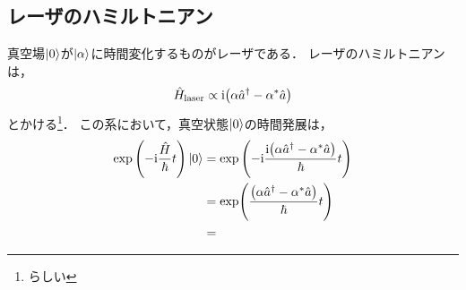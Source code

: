 \documentclass{report}
\begin{document}
  \subsection{レーザのハミルトニアン}
    真空場$\ket{0}$が$\ket{\alpha}$に時間変化するものがレーザである．
    レーザのハミルトニアンは，
    \begin{align}
      \hat{H}_{\mathrm{laser}} \propto \mathrm{i}\qty(\alpha\hat{a}^{\dag} - \alpha^*\hat{a})
    \end{align}
    とかける\footnote{らしい}．
    この系において，真空状態$\ket{0}$の時間発展は，
    \begin{align}
      \exp\qty(-\mathrm{i}\frac{\hat{H}}{\hbar}t)\ket{0} &= \exp\qty(-\mathrm{i}\frac{\mathrm{i}\qty(\alpha\hat{a}^{\dag} - \alpha^*\hat{a})}{\hbar}t) \\ 
      &= \exp(\frac{\qty(\alpha\hat{a}^{\dag} - \alpha^*\hat{a})}{\hbar}t) \\ 
      &= 
    \end{align}
\end{document}
